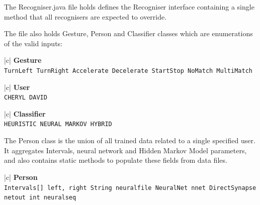 \documentclass[12pt,a4,notitlepage]{report}
\renewcommand{\_}{\texttt{\symbol{95}}}
\newcommand{\<}{\texttt{\symbol{60}}}
\renewcommand{\>}{\texttt{\symbol{62}}}
\newcommand{\class}[1]{\textbf{#1}}
\newcommand{\variable}[1]{\texttt{#1}}
\begin{document}
The Recogniser.java file holds defines the Recogniser interface containing a single method that all recognisers are expected to override.

The file also holds Gesture, Person and Classifier classes which are enumerations of the valid inputs:

\begin{tabular}[t]{|c|} \hline 
\class{Gesture} \\ \hline
{}
{\variable{TurnLeft \newline TurnRight \newline Accelerate \newline Decelerate \newline StartStop \newline NoMatch \newline MultiMatch
} } \\ \hline
\end{tabular}\hfill
\begin{tabular}[t]{|c|} \hline 
\class{User} \\ \hline
{}
{\variable{CHERYL \newline DAVID
} } \\ \hline
\end{tabular}\hfill
\begin{tabular}[t]{|c|} \hline 
\class{Classifier} \\ \hline
{}
{\variable{HEURISTIC \newline NEURAL \newline MARKOV \newline HYBRID
} } \\ \hline
\end{tabular}

The Person class is the union of all trained data related to a single specified user. It aggregates Intervals, neural network and Hidden Markov Model parameters, and also contains static methods to populate these fields from data files.

\begin{tabular}{|c|} \hline 
\class{Person} \\ \hline
{}
{\variable{Intervals[] left, right \newline String neural\_file \newline NeuralNet nnet \newline DirectSynapse netout \newline int neural\_seq 
} } \\ \hline
\end{tabular}
\end{document}
